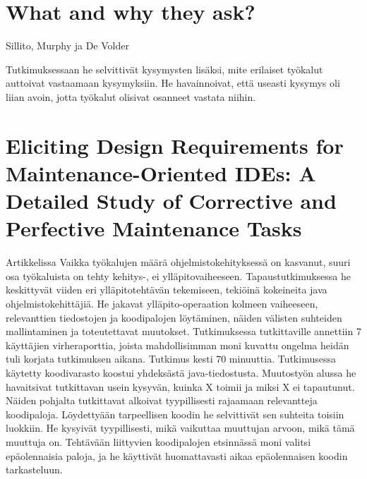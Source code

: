 \documentclass[finnish]{../tktltiki2}
\theoremstyle{definition}
\theoremstyle{remark}
\begin{document}
\section{What and why they ask?}

Sillito, Murphy ja De Volder \cite{questions-during-software-evolution-tasks}

Tutkimuksessaan he selvittivät kysymysten lisäksi, mite erilaiset työkalut auttoivat vastaamaan kysymyksiin. He havainnoivat, että useasti kysymys oli liian avoin, jotta työkalut olisivat osanneet vastata niihin.

\section{Eliciting Design Requirements for Maintenance-Oriented IDEs: A Detailed Study of Corrective and Perfective Maintenance Tasks}
Artikkelissa \cite{eliciting-design-requirements-for-maintenance-oriented-ides}
Vaikka työkalujen määrä ohjelmistokehityksessä on kasvanut, suuri osa työkaluista on tehty kehitys-, ei ylläpitovaiheeseen. Tapaustutkimuksessa he keskittyvät viiden eri ylläpitotehtävän tekemiseen, tekiöinä kokeineita java ohjelmistokehittäjiä.
He jakavat ylläpito-operaation kolmeen vaiheeseen, relevanttien tiedostojen ja koodipalojen löytäminen, näiden välisten suhteiden mallintaminen ja toteutettavat muutokset.
Tutkimuksessa tutkittaville annettiin 7 käyttäjien virheraporttia, joista mahdollisimman moni kuvattu ongelma heidän tuli korjata tutkimuksen aikana. Tutkimus kesti 70 minuuttia.
Tutkimusessa käytetty koodivarasto koostui yhdeksästä java-tiedostusta.
Muutostyön alussa he havaitsivat tutkittavan usein kysyvän, kuinka X toimii ja miksi X ei tapautunut. Näiden pohjalta tutkittavat alkoivat tyypillisesti rajaamaan relevantteja koodipaloja.
Löydettyään tarpeellisen koodin he selvittivät sen suhteita toisiin luokkiin. He kysyivät tyypillisesti, mikä vaikuttaa muuttujan arvoon, mikä tämä muuttuja on.
Tehtävään liittyvien koodipalojen etsinnässä moni valitsi epäolennaisia paloja, ja he käyttivät huomattavasti aikaa epäolennaisen koodin tarkasteluun.
\end{document}

